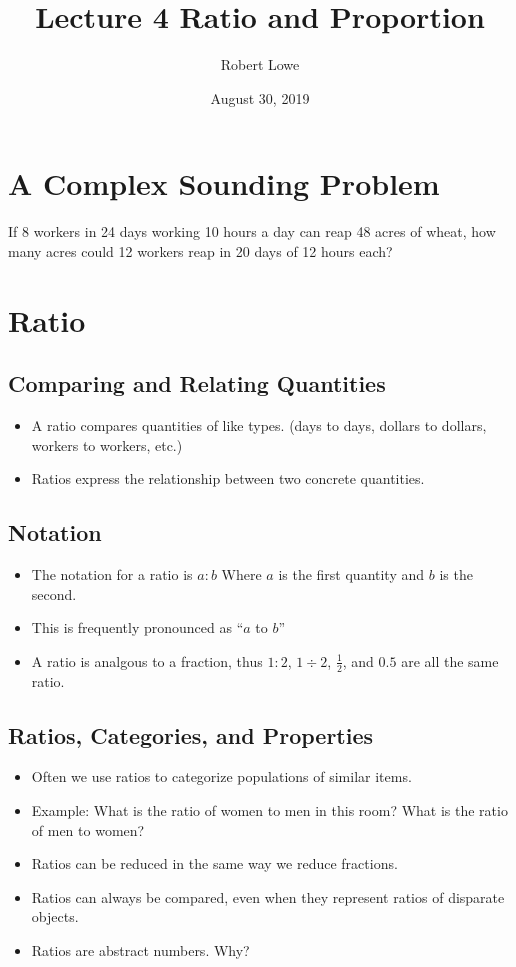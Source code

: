 \documentclass{article}
\title{Lecture 4 Ratio and Proportion}
\author{Robert Lowe}
\date{August 30, 2019}
\begin{document}
\maketitle
\section*{A Complex Sounding Problem}
If 8 workers in 24 days working 10 hours a day can reap 48 acres of wheat, how many acres could 12 workers reap in 20 days of 12 hours each?

\section*{Ratio}
\subsection*{Comparing and Relating Quantities}
\begin{itemize}
    \item A ratio compares quantities of like types. (days to days, dollars to dollars, 
    workers to workers, etc.)
    \item Ratios express the relationship between two concrete quantities.
\end{itemize}

\subsection*{Notation}
\begin{itemize}
    \item The notation for a ratio is $a:b$ Where $a$ is the first quantity and $b$ is the second.
    \item This is frequently pronounced as ``$a$ to $b$''
    \item A ratio is analgous to a fraction, thus $1:2$, $1\div 2$, $\frac{1}{2}$, and $0.5$ are all the same ratio.
\end{itemize}

\subsection*{Ratios, Categories, and Properties}
\begin{itemize}
    \item Often we use ratios to categorize populations of similar items.
    \item Example:  What is the ratio of women to men in this room? What is the ratio of men to women?
    \item Ratios can be reduced in the same way we reduce fractions.
    \item Ratios can always be compared, even when they represent ratios of disparate objects.
    \item Ratios are abstract numbers. Why?
\end{itemize}
\end{document}
